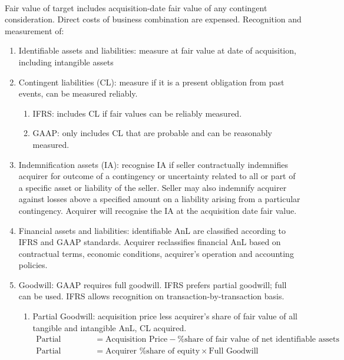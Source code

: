 \begin{method} \\
Fair value of target includes acquisition-date fair value of any contingent consideration. Direct costs of business combination are expensed. Recognition and measurement of:
\begin{enumerate}[label=\roman*.]
\setlength{\itemsep}{0pt}
\item Identifiable assets and liabilities: measure at fair value at date of acquisition, including intangible assets
\item Contingent liabilities (CL): measure if it is a present obligation from past events, can be measured reliably.
\begin{enumerate}[label=\arabic*.]
\setlength{\itemsep}{0pt}
\item IFRS: includes CL if fair values can be reliably measured.
\item GAAP: only includes CL that are probable and can be reasonably measured.
\end{enumerate}
\item Indemnification assets (IA): recognise IA if seller contractually indemnifies acquirer for outcome of a contingency or uncertainty related to all or part of a specific asset or liability of the seller. Seller may also indemnify acquirer against losses above a specified amount on a liability arising from a particular contingency. Acquirer will recognise the IA at the acquisition date fair value.
\item Financial assets and liabilities: identifiable AnL are classified according to IFRS and GAAP standards. Acquirer reclassifies financial AnL based on contractual terms, economic conditions, acquirer’s operation and accounting policies.
\item Goodwill: GAAP requires full goodwill. IFRS prefers partial goodwill; full can be used. IFRS allows recognition on transaction-by-transaction basis. 
\begin{enumerate}[label=\arabic*.]
\setlength{\itemsep}{0pt}
\item Partial Goodwill: acquisition price less acquirer’s share of fair value of all tangible and intangible AnL, CL acquired. \begin{align}
\text{Partial Goodwill} &= \text{Acquisition Price} - \text{\% share of fair value of net identifiable assets} \nonumber \\
\text{Partial Goodwill} &= \text{Acquirer \% share of equity} \times \text{Full Goodwill} \nonumber \\

\end{align}
\end{enumerate}
\end{enumerate}
\end{method}
